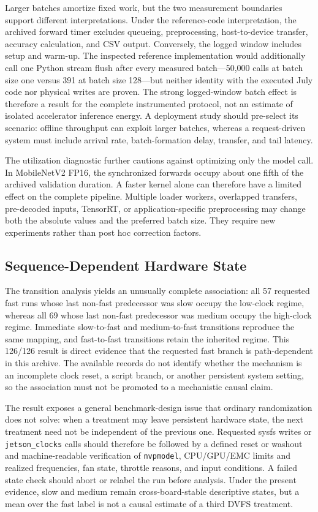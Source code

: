\documentclass[electronics,article,submit,pdftex,moreauthors]{Definitions/mdpi}
\newcommand{\mobile}{MobileNetV2}
\begin{document}
Larger batches amortize fixed work, but the two measurement boundaries support different interpretations. Under the reference-code interpretation, the archived forward timer excludes queueing, preprocessing, host-to-device transfer, accuracy calculation, and CSV output. Conversely, the logged window includes setup and warm-up. The inspected reference implementation would additionally call one Python stream flush after every measured batch---50,000 calls at batch size one versus 391 at batch size 128---but neither identity with the executed July code nor physical writes are proven. The strong logged-window batch effect is therefore a result for the complete instrumented protocol, not an estimate of isolated accelerator inference energy. A deployment study should pre-select its scenario: offline throughput can exploit larger batches, whereas a request-driven system must include arrival rate, batch-formation delay, transfer, and tail latency.

The utilization diagnostic further cautions against optimizing only the model call. In \mobile{} FP16, the synchronized forwards occupy about one fifth of the archived validation duration. A faster kernel alone can therefore have a limited effect on the complete pipeline. Multiple loader workers, overlapped transfers, pre-decoded inputs, TensorRT, or application-specific preprocessing may change both the absolute values and the preferred batch size. They require new experiments rather than post hoc correction factors.

\subsection{Sequence-Dependent Hardware State}

The transition analysis yields an unusually complete association: all 57 requested fast runs whose last non-fast predecessor was slow occupy the low-clock regime, whereas all 69 whose last non-fast predecessor was medium occupy the high-clock regime. Immediate slow-to-fast and medium-to-fast transitions reproduce the same mapping, and fast-to-fast transitions retain the inherited regime. This 126/126 result is direct evidence that the requested fast branch is path-dependent in this archive. The available records do not identify whether the mechanism is an incomplete clock reset, a script branch, or another persistent system setting, so the association must not be promoted to a mechanistic causal claim.

The result exposes a general benchmark-design issue that ordinary randomization does not solve: when a treatment may leave persistent hardware state, the next treatment need not be independent of the previous one. Requested sysfs writes or \texttt{jetson\_clocks} calls should therefore be followed by a defined reset or washout and machine-readable verification of \texttt{nvpmodel}, CPU/GPU/EMC limits and realized frequencies, fan state, throttle reasons, and input conditions. A failed state check should abort or relabel the run before analysis. Under the present evidence, slow and medium remain cross-board-stable descriptive states, but a mean over the fast label is not a causal estimate of a third DVFS treatment.
\end{document}
